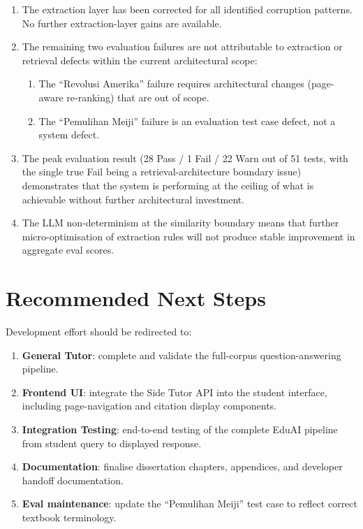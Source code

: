 \documentclass[12pt, a4paper]{report}
\begin{document}
\begin{enumerate}
  \item The extraction layer has been corrected for all identified corruption
        patterns. No further extraction-layer gains are available.

  \item The remaining two evaluation failures are not attributable to extraction
        or retrieval defects within the current architectural scope:
        \begin{enumerate}[label=\alph*)]
          \item The ``Revolusi Amerika'' failure requires architectural changes
                (page-aware re-ranking) that are out of scope.
          \item The ``Pemulihan Meiji'' failure is an evaluation test case defect,
                not a system defect.
        \end{enumerate}

  \item The peak evaluation result (28 Pass / 1 Fail / 22 Warn out of 51 tests,
        with the single true Fail being a retrieval-architecture boundary issue)
        demonstrates that the system is performing at the ceiling of what is
        achievable without further architectural investment.

  \item The LLM non-determinism at the similarity boundary means that further
        micro-optimisation of extraction rules will not produce stable
        improvement in aggregate eval scores.
\end{enumerate}

\section{Recommended Next Steps}

Development effort should be redirected to:

\begin{enumerate}[noitemsep]
  \item \textbf{General Tutor}: complete and validate the full-corpus
        question-answering pipeline.
  \item \textbf{Frontend UI}: integrate the Side Tutor API into the student
        interface, including page-navigation and citation display components.
  \item \textbf{Integration Testing}: end-to-end testing of the complete
        EduAI pipeline from student query to displayed response.
  \item \textbf{Documentation}: finalise dissertation chapters, appendices,
        and developer handoff documentation.
  \item \textbf{Eval maintenance}: update the ``Pemulihan Meiji'' test case
        to reflect correct textbook terminology.
\end{enumerate}
\end{document}
